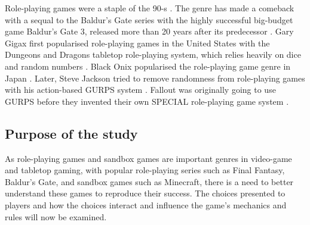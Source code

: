 Role-playing games were a staple of the 90-s \autocite{sales}. The genre has made a comeback with a sequal to the Baldur's Gate series with the highly successful big-budget game Baldur's Gate 3, released more than 20 years after its predecessor \autocite{gate3}. Gary Gigax first popularised role-playing games in the United States with the Dungeons and Dragons tabletop role-playing system, which relies heavily on dice and random numbers \autocite{dnd}. Black Onix popularised the role-playing game genre in Japan \autocite{tetris}.
Later, Steve Jackson tried to remove randomness from role-playing games with his action-based GURPS system \autocite{gurps}. Fallout was originally going to use GURPS before they invented their own SPECIAL role-playing game system \autocite{special}.

\subsection{Purpose of the study}

As role-playing games and sandbox games are important genres in video-game and tabletop gaming, with popular role-playing series such as Final Fantasy, Baldur's Gate, and sandbox games such as Minecraft, there is a need to better understand these games to reproduce their success. The choices presented to players and how the choices interact and influence the game's mechanics and rules will now be examined.
